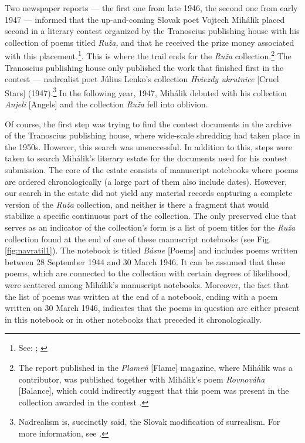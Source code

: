 \documentclass{article}
\begin{document}
Two newspaper reports –– the first one from late 1946, the second one
from early 1947 –– informed that the up-and-coming Slovak poet Vojtech
Mihálik placed second in a literary contest organized by the Tranoscius
publishing house with his collection of poems titled \emph{Ruža,} and that he
received the prize money associated with this placement.\footnote{See: \cite[4]{noauthor_vysledok_1946}; \cite[169]{noauthor_radost_1947}}. This
is where the trail ends for the \emph{Ruža} collection.\footnote{The report
  published in the \emph{Plameň} [Flame] magazine, where Mihálik was
  a contributor, was published together with Mihálik's poem
  \emph{Rovnováha} [Balance], which could indirectly suggest that this
  poem was present in the collection awarded in the contest \mancite\parencite[169]{noauthor_radost_1947}.} The
Tranoscius publishing house only published the work that finished first
in the contest –– nadrealist poet Július Lenko's collection
\emph{Hviezdy ukrutnice} [Cruel Stars] (1947).\footnote{Nadrealism is, succinctly said, the Slovak modification of surrealism. For more information, see \parencite[167--168]{vlasin_slovnik_1977}.} In the following year,
1947, Mihálik debuted with his collection \emph{Anjeli} [Angels] and the
collection \emph{Ruža} fell into oblivion.

Of course, the first step was trying to find the contest documents in
the archive of the Tranoscius publishing house, where wide-scale
shredding had taken place in the 1950s. However, this search was
unsuccessful. In addition to this, steps were taken to search Mihálik's
literary estate for the documents used for his contest submission. The
core of the estate consists of manuscript notebooks where poems are
ordered chronologically (a large part of them also include dates).
However, our search in the estate did not yield any material records
capturing a complete version of the \emph{Ruža} collection, and neither
is there a fragment that would stabilize a specific continuous part of
the collection. The only preserved clue that serves as an indicator of
the collection's form is a list of poem titles for the \emph{Ruža}
collection found at the end of one of these manuscript
notebooks (see Fig. \ref{fig:navratil1}). The notebook is titled \emph{Básne} [Poems] and includes
poems written between 28 September 1944 and 30 March 1946. It can be
assumed that these poems, which are connected to the collection with
certain degrees of likelihood, were scattered among Mihálik's manuscript
notebooks. Moreover, the fact that the list of poems was written at the
end of a notebook, ending with a poem written on 30 March 1946, indicates
that the poems in question are either present in this notebook or in
other notebooks that preceded it chronologically.
  
\end{document}
